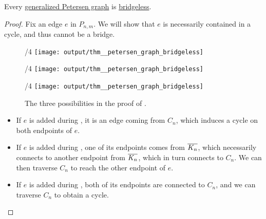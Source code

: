 \begin{proposition}\label{thm:petersen_graph_bridgeless}
  Every \hyperref[def:petersen_graph]{generalized Petersen graph} is \hyperref[def:bridgeless_graph]{bridgeless}.
\end{proposition}
\begin{proof}
  Fix an edge \( e \) in \( P_{n,m} \). We will show that \( e \) is necessarily contained in a cycle, and thus cannot be a bridge.

  \begin{figure}[!ht]
    \begin{subcaptionblock}{\textwidth/4}
      \centering
      \texttt{[image: output/thm\_\_petersen\_graph\_bridgeless]}
    \end{subcaptionblock}
    \hfill
    \begin{subcaptionblock}{\textwidth/4}
      \centering
      \texttt{[image: output/thm\_\_petersen\_graph\_bridgeless]}
    \end{subcaptionblock}
    \hfill
    \begin{subcaptionblock}{\textwidth/4}
      \centering
      \texttt{[image: output/thm\_\_petersen\_graph\_bridgeless]}
    \end{subcaptionblock}

    \caption{The three possibilities in the proof of .}\label{fig:thm:petersen_graph_bridgeless/proof}
  \end{figure}

  \begin{itemize}
    \item If \( e \) is added during , it is an edge coming from \( C_n \), which induces a cycle on both endpoints of \( e \).

    \item If \( e \) is added during , one of its endpoints comes from \( \oline{K_n} \), which necessarily connects to another endpoint from \( \oline{K_n} \), which in turn connects to \( C_n \). We can then traverse \( C_n \) to reach the other endpoint of \( e \).

    \item If \( e \) is added during , both of its endpoints are connected to \( C_n \), and we can traverse \( C_n \) to obtain a cycle.
  \end{itemize}
\end{proof}

